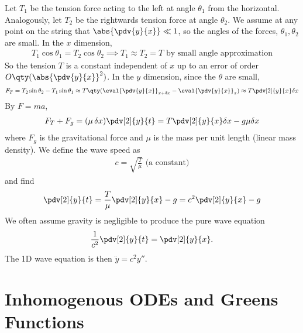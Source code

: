     Let $T_1$ be the tension force acting to the left at angle $\theta_1$ from the horizontal.
    Analogously, let $T_2$ be the rightwards tension force at angle $\theta_2$.
    We assume at any point on the string that $\abs{\pdv{y}{x}} \ll 1$, so the angles of the forces, $\theta_1, \theta_2$ are small.
    In the $x$ dimension,
    \begin{align*}
        T_1 \cos \theta_1 = T_2 \cos \theta_2 \implies T_1 \approx T_2 = T \text{ by small angle approximation}
    \end{align*}
    So the tension $T$ is a constant independent of $x$ up to an error of order $O\qty(\abs{\pdv{y}{x}
    }^2)$.
    In the $y$ dimension, since the $\theta$ are small,
    \begin{align*}
        F_T = T_2 \sin \theta_2 - T_1 \sin \theta_1 \approx T \qty(\eval{\pdv{y}{x}}_{x + \delta x} - \eval{\pdv{y}{x}}_x) \approx T \pdv[2]{y}{x} \delta x
    \end{align*}
    By $F = ma$,
    \begin{align*}
        F_T + F_g = (\mu \, \delta x) \pdv[2]{y}{t} = T \pdv[2]{y}{x} \delta x - g \mu \delta x
    \end{align*}
    where $F_g$ is the gravitational force and $\mu$ is the mass per unit length (linear mass density).
    We define the wave speed as
    \begin{align*}
        c = \sqrt{\frac{T}{\mu}} \text{ (a constant)}
    \end{align*}
    and find
    \begin{align}
        \pdv[2]{y}{t} = \frac{T}{\mu} \pdv[2]{y}{x} - g = c^2 \pdv[2]{y}{x} - g \label{eq:3.3}
    \end{align}
    We often assume gravity is negligible to produce the pure wave equation
    \begin{align} \label{eq:3.4}
        \frac{1}{c^2} \pdv[2]{y}{t} = \pdv[2]{y}{x}.
    \end{align}
    The 1D wave equation is then $\ddot{y} = c^2 y''$.
    
    \part{Inhomogenous ODEs and Greens Functions}
